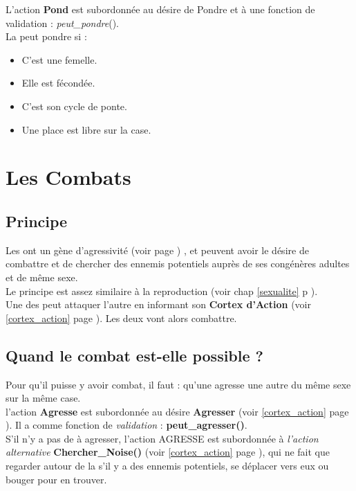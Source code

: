 \documentclass[french]{report}
\newlength{\du}\fi
\begin{document}
L'action \textbf{Pond} est subordonnée au désire de Pondre et à une fonction de validation : \textit{peut\_pondre}().\\

La \CoCiX peut pondre si : 
\begin{itemize}
	\item C'est une femelle.
	\item Elle est fécondée.
	\item C'est son cycle de ponte.
	\item Une place est libre sur la case.\\
\end{itemize}

\newpage
\chapter{Les Combats}\label{combat}
\section{Principe}

Les \CoCiX ont un gène d'agressivité (voir page \pageref{agressivite}) , et peuvent avoir le désire de combattre et de chercher des ennemis potentiels auprès de ses congénères adultes et de même sexe.\\
Le principe est assez similaire à la reproduction (voir chap \ref{sexualite} p \pageref{sexualite}). \\

Une des \CoCiX peut attaquer l'autre en informant son \textbf{Cortex d'Action} (voir \ref{cortex_action} page \pageref{cortex_action}). Les deux \CoCiX vont alors combattre.\\

\section{Quand le combat est-elle possible ?}

Pour qu'il puisse y avoir combat, il faut  : qu'une  \CoCiX agresse une autre \CoCiX du même sexe sur la même case.\\

l'action \textbf{Agresse} est subordonnée au désire \textbf{Agresser} (voir \ref{cortex_action} page \pageref{cortex_action}). Il a comme fonction de \textit{validation} : \textbf{peut\_agresser()}. \\

S'il n'y a pas de \CoCiX à agresser, l'action AGRESSE est subordonnée à \textit{l'action alternative} \textbf{Chercher\_Noise()} (voir \ref{cortex_action} page \pageref{cortex_action}), qui ne fait que regarder autour de la \CoCiX s'il y a des ennemis potentiels, se déplacer vers eux ou bouger pour en trouver.\\
\end{document}
